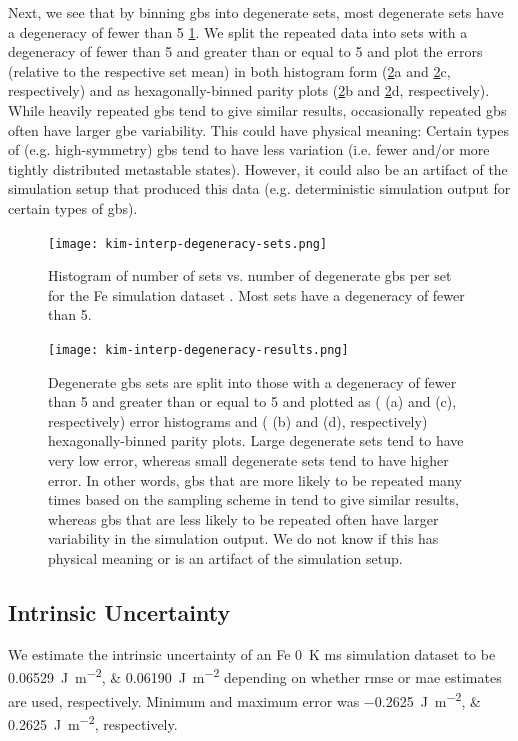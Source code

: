 \documentclass[preprint,12pt]{elsarticle}
\begin{document}
	Next, we see that by binning \glspl{gb} into degenerate sets, most degenerate sets have a degeneracy of fewer than 5 \cref{fig:kim-interp-degeneracy-sets}. We split the repeated data into sets with a degeneracy of fewer than 5 and greater than or equal to 5 and plot the errors (relative to the respective set mean) in both histogram form (\cref{fig:kim-interp-degeneracy-results}a and \cref{fig:kim-interp-degeneracy-results}c, respectively) and as hexagonally-binned parity plots (\cref{fig:kim-interp-degeneracy-results}b and \cref{fig:kim-interp-degeneracy-results}d, respectively). While heavily repeated \glspl{gb} tend to give similar results, occasionally repeated \glspl{gb} often have larger \gls{gbe} variability. This could have physical meaning: Certain types of (e.g. high-symmetry) \glspl{gb} tend to have less variation (i.e. fewer and/or more tightly distributed metastable states). However, it could also be an artifact of the simulation setup that produced this data (e.g. deterministic simulation output for certain types of \glspl{gb}).
	
	\begin{figure}
		\centering
		\texttt{[image: kim-interp-degeneracy-sets.png]}
		\caption{Histogram of number of sets vs. number of degenerate \glspl{gb} per set for the Fe simulation dataset \cite{kimPhasefieldModeling3D2014}. Most sets have a degeneracy of fewer than 5.}
		\label{fig:kim-interp-degeneracy-sets}
	\end{figure}
	
	\begin{figure}
		\centering
		\texttt{[image: kim-interp-degeneracy-results.png]}
		\caption{Degenerate \glspl{gb} sets are split into those with a degeneracy of fewer than 5 and greater than or equal to 5 and plotted as ( (a) and (c), respectively) error histograms and ( (b) and (d), respectively) hexagonally-binned parity plots. Large degenerate sets tend to have very low error, whereas small degenerate sets tend to have higher error. In other words, \glspl{gb} that are more likely to be repeated many times based on the sampling scheme in \cite{kimPhasefieldModeling3D2014} tend to give similar results, whereas \glspl{gb} that are less likely to be repeated often have larger variability in the simulation output. We do not know if this has physical meaning or is an artifact of the simulation setup.}
		\label{fig:kim-interp-degeneracy-results}
	\end{figure}
		
	\subsection{Intrinsic Uncertainty} \label{sec:results:lit:error}
	We estimate the intrinsic uncertainty of an Fe \SI{0}{\kelvin} \gls{ms} simulation dataset to be \SIlist{0.06529;0.06190}{\joule\per\square\meter} depending on whether \gls{rmse} or \gls{mae} estimates are used, respectively. Minimum and maximum error was \SIlist{-0.2625;0.2625}{\joule\per\square\meter}, respectively.
\end{document}
